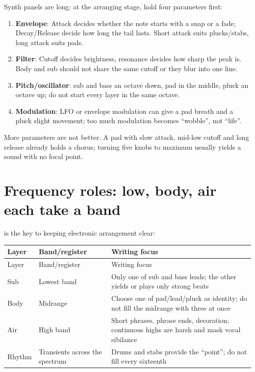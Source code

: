 Synth panels are long; at the arranging stage, hold four parameters first:

\begin{enumerate}
\item \textbf{Envelope}: Attack decides whether the note starts with a snap or a fade; Decay/Release decide how long the tail lasts. Short attack suits plucks/stabs, long attack suits pads.
\item \textbf{Filter}: Cutoff decides brightness, resonance decides how sharp the peak is. Body and sub should not share the same cutoff or they blur into one line.
\item \textbf{Pitch/oscillator}: sub and bass an octave down, pad in the middle, pluck an octave up; do not start every layer in the same octave.
\item \textbf{Modulation}: LFO or envelope modulation can give a pad breath and a pluck slight movement; too much modulation becomes ``wobble'', not ``life''.
\end{enumerate}

More parameters are not better. A pad with slow attack, mid-low cutoff and long release already holds a chorus; turning five knobs to maximum usually yields a sound with no focal point.

\section{Frequency roles: low, body, air each take a band}
\label{sec:frequency-roles}

 is the key to keeping electronic arrangement clear:

\begin{longtable}{p{}p{}p{}}
\toprule
Layer & Band/register & Writing focus \\
\midrule
\endfirsthead
\toprule
Layer & Band/register & Writing focus \\
\midrule
\endhead
Sub & Lowest band & Only one of sub and bass leads; the other yields or plays only strong beats \\
Body & Midrange & Choose one of pad/lead/pluck as identity; do not fill the midrange with three at once \\
Air & High band & Short phrases, phrase ends, decoration; continuous highs are harsh and mask vocal sibilance \\
Rhythm & Transients across the spectrum & Drums and stabs provide the ``point''; do not fill every sixteenth \\
\bottomrule
\end{longtable}

